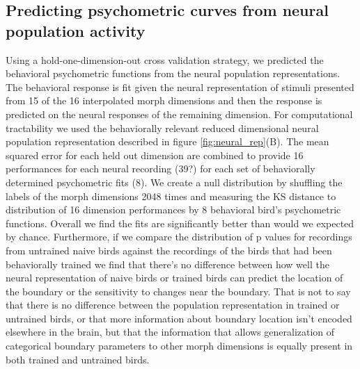 \subsection{Predicting psychometric curves from neural population activity}


Using a hold-one-dimension-out cross validation strategy, we predicted the behavioral psychometric functions from the neural population representations. The behavioral response is fit given the neural representation of stimuli presented from 15 of the 16 interpolated morph dimensions and then the response is predicted on the neural responses of the remaining dimension. For computational tractability we used the behaviorally relevant reduced dimensional neural population representation described in figure \ref{fig:neural_rep}(B). The mean squared error for each held out dimension are combined to provide 16 performances for each neural recording (39?) for each set of behaviorally determined psychometric fits (8). We create a null distribution by shuffling the labels of the morph dimensions 2048 times and measuring the KS distance to distribution of 16 dimension performances by 8 behavioral bird's psychometric functions. Overall we find the fits are significantly better than would we expected by chance. Furthermore, if we compare the distribution of p values for recordings from untrained naive birds against the recordings of the birds that had been behaviorally trained we find that there's no difference between how well the neural representation of naive birds or trained birds can predict the location of the boundary or the sensitivity to changes near the boundary. That is not to say that there is no difference between the population representation in trained or untrained birds, or that more information about boundary location isn't encoded elsewhere in the brain, but that the information that allows generalization of categorical boundary parameters to other morph dimensions is equally present in both trained and untrained birds.